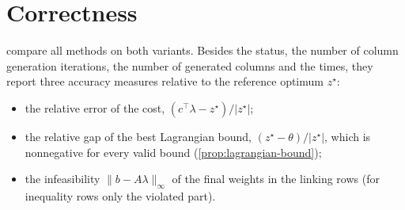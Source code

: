 \section{Correctness}
\label{sec:results-correctness}

 compare all methods on both variants. Besides the
status, the number of column generation iterations, the number of generated columns and the
times, they report three accuracy measures relative to the reference optimum $z^\star$:
\begin{itemize}
    \item the relative error of the cost, $(c^\top\lambda - z^\star)/|z^\star|$;
    \item the relative gap of the best Lagrangian bound, $(z^\star - \theta)/|z^\star|$, which
          is nonnegative for every valid bound (\cref{prop:lagrangian-bound});
    \item the infeasibility $\lVert b - A\lambda\rVert_\infty$ of the final weights in the linking
          rows (for inequality rows only the violated part).
\end{itemize}

\begin{table}[!htbp]
\centering
\scriptsize
\renewcommand{\arraystretch}{1.15}
\setlength{\tabcolsep}{4pt}
\caption{Equality variant: all methods. ``time'' denotes a method stopped by its time limit.
Master times are averages per column generation iteration.}
\label{tab:comparison-eq}
\end{table}

\begin{table}[!htbp]
\centering
\scriptsize
\renewcommand{\arraystretch}{1.15}
\setlength{\tabcolsep}{4pt}
\caption{Inequality variant (30\% ``$\ge$'' rows). The eliminated HiGHS QP master does not
support inequality rows.}
\label{tab:comparison-ineq}
\end{table}

